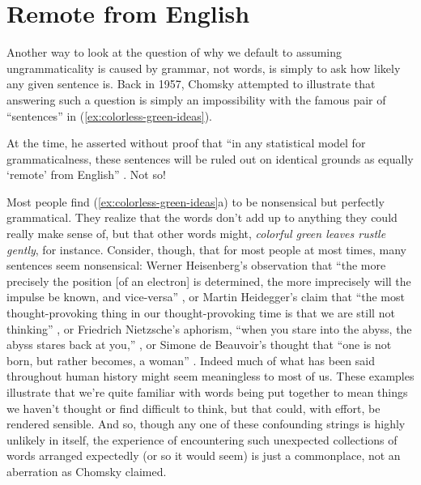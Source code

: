 \section{Remote from English}

Another way to look at the question of why we default to assuming ungrammaticality is caused by grammar, not words, is simply to ask how likely any given sentence is. Back in 1957, Chomsky attempted to illustrate that answering such a question is simply an impossibility with the famous pair of \enquote{sentences} in (\ref{ex:colorless-green-ideas}).

\ea \label{ex:colorless-green-ideas}
    \z
\z

At the time, he asserted without proof that \enquote{in any statistical model for grammaticalness, these sentences will be ruled out on identical grounds as equally \enquote{remote} from English} \citep[15]{Chomsky1957}. Not so!

Most people find (\ref{ex:colorless-green-ideas}a) to be nonsensical but perfectly grammatical. They realize that the words don't add up to anything they could really make sense of, but that other words might, \textit{colorful green leaves rustle gently}, for instance. Consider, though, that for most people at most times, many sentences seem nonsensical: Werner Heisenberg's observation that \enquote{the more precisely the position [of an electron] is determined, the more imprecisely will the impulse be known, and vice-versa} \citep[5]{Heisenberg1927}, or Martin Heidegger's claim that \enquote{the most thought-provoking thing in our thought-provoking time is that we are still not thinking} \citep{Heidegger1993}, or Friedrich Nietzsche's aphorism, \enquote{when you stare into the abyss, the abyss stares back at you,} \citep{NietzscheBeyondGoodAndEvil}, or Simone de Beauvoir's thought that \enquote{one is not born, but rather becomes, a woman} \citep{DeBeauvoir1949}. Indeed much of what has been said throughout human history might seem meaningless to most of us. These examples illustrate that we're quite familiar with words being put together to mean things we haven't thought or find difficult to think, but that could, with effort, be rendered sensible. And so, though any one of these confounding strings is highly unlikely in itself, the experience of encountering such unexpected collections of words arranged expectedly (or so it would seem) is just a commonplace, not an aberration as Chomsky claimed.

